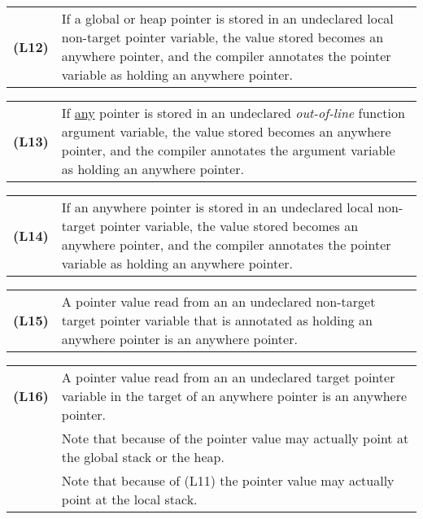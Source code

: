 \documentclass[12pt]{article}
\newcommand{\key}[1]{{\rm \bfseries #1}}
\newenvironment{indpar}[1][0.3in]%
	{\begin{list}{}%
		     {\setlength{\itemsep}{0in}%
		      \setlength{\topsep}{0in}%
		      \setlength{\parsep}{1ex}%
		      \setlength{\labelwidth}{#1}%
		      \setlength{\leftmargin}{#1}%
		      \addtolength{\leftmargin}{\labelsep}}%
	 \item}%
	{\end{list}}
\begin{document}
\newcommand{\GlobalOrHeapToUndeclared}{(L12)}
\newcommand{\AnyToOutOfLineUndeclared}{(L13)}
\begin{indpar}[0.2in]

\begin{tabular}{p{0.5in}p{5.0in}}
\key{\GlobalOrHeapToUndeclared}
		& If a global or heap pointer is stored in an
                  undeclared local non-target pointer variable,
		  the value stored becomes an anywhere pointer,
		  and the compiler
		  annotates the pointer variable as holding
		  an anywhere pointer.
\end{tabular}

\begin{tabular}{p{0.5in}p{5.0in}}
\key{\AnyToOutOfLineUndeclared}
		& If \underline{any} pointer is stored in an
                  undeclared {\em out-of-line} function argument variable,
		  the value stored becomes an anywhere pointer,
		  and the compiler
		  annotates the argument variable as holding
		  an anywhere pointer.
\end{tabular}

\begin{tabular}{p{0.5in}p{5.0in}}
\key{(L14)}	& If an anywhere pointer is stored in an
                  undeclared local non-target pointer variable,
		  the value stored becomes an anywhere pointer,
		  and the compiler
		  annotates the pointer variable as holding
		  an anywhere pointer.
\end{tabular}

\begin{tabular}{p{0.5in}p{5.0in}}
\key{(L15)}	& A pointer value read from an
		  an undeclared non-target target pointer variable
		  that is annotated as holding an anywhere pointer
		  is an anywhere pointer.
\end{tabular}

\begin{tabular}{p{0.5in}p{5.0in}}
\key{(L16)}	& A pointer value read from an
		  an undeclared target pointer variable
		  in the target of an anywhere pointer
		  is an anywhere pointer.
\\[1ex]
		& Note that because of \UndeclaredToGlobalOrHeap{}
		  the pointer value may actually
		  point at the global stack or the heap.
\\[1ex]
		& Note that because of (L11) the pointer value may actually
		  point at the local stack.
\end{tabular}

\end{indpar}
\end{document}
